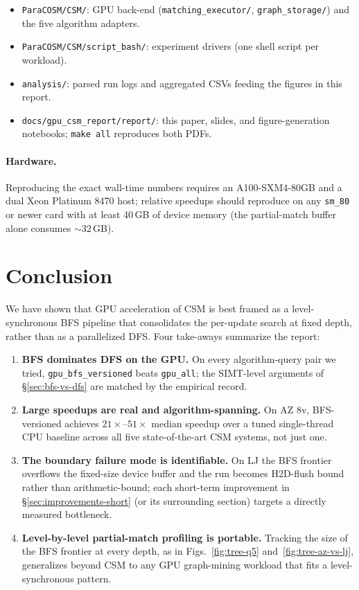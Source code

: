 \documentclass[sigconf,nonacm]{acmart}
\theoremstyle{definition}
\begin{document}
\begin{itemize}
  \item \texttt{ParaCOSM/CSM/}: GPU back-end (\texttt{matching\_executor/}, \texttt{graph\_storage/}) and the five algorithm adapters.
  \item \texttt{ParaCOSM/CSM/script\_bash/}: experiment drivers (one shell script per workload).
  \item \texttt{analysis/}: parsed run logs and aggregated CSVs feeding the figures in this report.
  \item \texttt{docs/gpu\_csm\_report/report/}: this paper, slides, and figure-generation notebooks; \texttt{make all} reproduces both PDFs.
\end{itemize}

\paragraph{Hardware.} Reproducing the exact wall-time numbers requires an A100-SXM4-80GB and a dual Xeon Platinum 8470 host; relative speedups should reproduce on any \texttt{sm\_80} or newer card with at least 40\,GB of device memory (the partial-match buffer alone consumes $\sim 32$\,GB).

\section{Conclusion}
We have shown that GPU acceleration of CSM is best framed as a level-synchronous BFS pipeline that consolidates the per-update search at fixed depth, rather than as a parallelized DFS. Four take-aways summarize the report:

\begin{enumerate}
  \item \textbf{BFS dominates DFS on the GPU.} On every algorithm-query pair we tried, \texttt{gpu\_bfs\_versioned} beats \texttt{gpu\_all}; the SIMT-level arguments of \S\ref{sec:bfs-vs-dfs} are matched by the empirical record.
  \item \textbf{Large speedups are real and algorithm-spanning.} On AZ 8v, BFS-versioned achieves $21\times$--$51\times$ median speedup over a tuned single-thread CPU baseline across all five state-of-the-art CSM systems, not just one.
  \item \textbf{The boundary failure mode is identifiable.} On LJ the BFS frontier overflows the fixed-size device buffer and the run becomes H2D-flush bound rather than arithmetic-bound; each short-term improvement in \S\ref{sec:improvements-short} (or its surrounding section) targets a directly measured bottleneck.
  \item \textbf{Level-by-level partial-match profiling is portable.} Tracking the size of the BFS frontier at every depth, as in Figs.~\ref{fig:tree-q5} and~\ref{fig:tree-az-vs-lj}, generalizes beyond CSM to any GPU graph-mining workload that fits a level-synchronous pattern.
\end{enumerate}



\end{document}
